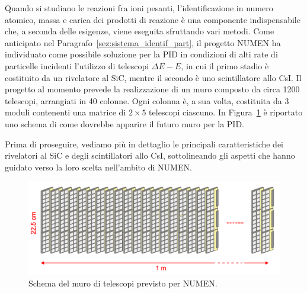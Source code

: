 

Quando si studiano le reazioni fra ioni pesanti, l'identificazione in numero atomico, massa e carica dei prodotti di reazione è una componente indispensabile che, a seconda delle esigenze, viene eseguita sfruttando vari metodi.
Come anticipato nel Paragrafo~\ref{sez:sistema_identif_part}, il progetto NUMEN ha individuato come possibile soluzione per la PID in condizioni di alti rate di particelle incidenti l'utilizzo di telescopi $\Delta E - E$, in cui il primo stadio è costituito da un rivelatore al SiC, mentre il secondo è uno scintillatore allo CsI.
Il progetto al momento prevede la realizzazione di un muro composto da circa 1200 telescopi, arrangiati in 40 colonne.
Ogni colonna è, a sua volta, costituita da 3 moduli contenenti una matrice di $2 \times 5$ telescopi ciascuno.
In Figura~\ref{fig:muro_telescopi} è riportato uno schema di come dovrebbe apparire il futuro muro per la PID.

Prima di proseguire, vediamo più in dettaglio le principali caratteristiche dei rivelatori al SiC e degli scintillatori allo CsI, sottolineando gli aspetti che  hanno guidato verso la loro scelta nell'ambito di NUMEN.


\begin{figure} [!t]
	\centering
	\includegraphics[width=\textwidth, keepaspectratio]{Grafici/muro_telescopi.png}
	\caption{Schema del muro di telescopi previsto per NUMEN.} \label{fig:muro_telescopi}
\end{figure}



